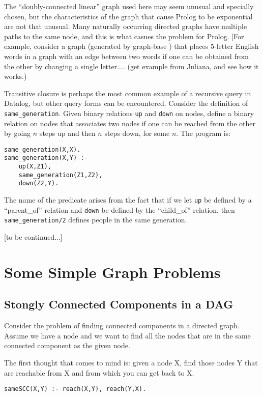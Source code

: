 The ``doubly-connected linear'' graph used here may seem unusual and
specially chosen, but the characteristics of the graph that cause
Prolog to be exponential are not that unusual.  Many naturally
occurring directed graphs have multiple paths to the same node, and
this is what casues the problem for Prolog.  [For example, consider a
graph (generated by graph-base \cite{graphbase}) that places 5-letter
English words in a graph with an edge between two words if one can be
obtained from the other by changing a single letter.... (get example
from Juliana, and see how it works.)

Transitive closure is perhaps the most common example of a recursive
query in Datalog, but other query forms can be encountered.  Consider
the definition of \verb|same_generation|.  Given binary relations
\verb|up| and \verb|down| on nodes, define a binary relation on nodes 
that associates two nodes if one can be reached from the other by
going $n$ steps up and then $n$ steps down, for some $n$.  The program
is:

\begin{verbatim}
same_generation(X,X).
same_generation(X,Y) :- 
    up(X,Z1),
    same_generation(Z1,Z2),
    down(Z2,Y).
\end{verbatim}

The name of the predicate arises from the fact that if we let \verb|up|
be defined by a ``parent\_of'' relation and \verb|down| be defined by
the ``child\_of'' relation, then \verb|same_generation/2| defines
people in the same generation.

[to be continued...]

\section{Some Simple Graph Problems}

\subsection{Stongly Connected Components in a DAG}

Consider the problem of finding connected components in a directed
graph.  Assume we have a node and we want to find all the nodes that
are in the same connected component as the given node.

The first thought that comes to mind is: given a node X, find those
nodes Y that are reachable from X and from which you can get back to
X.  
\begin{verbatim}
sameSCC(X,Y) :- reach(X,Y), reach(Y,X).
\end{verbatim}

